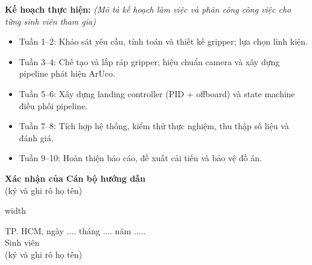 \begin{mdframed}[style=decuongfield]
\vspace{1mm}
\textbf{Kế hoạch thực hiện:} \textit{(Mô tả kế hoạch làm việc và phân công công việc cho từng sinh viên tham gia)}
\begin{itemize}
\item Tuần 1--2: Khảo sát yêu cầu, tính toán và thiết kế gripper; lựa chọn linh kiện.
\item Tuần 3--4: Chế tạo và lắp ráp gripper; hiệu chuẩn camera và xây dựng pipeline phát hiện ArUco.
\item Tuần 5--6: Xây dựng landing controller (PID + offboard) và state machine điều phối pipeline.
\item Tuần 7--8: Tích hợp hệ thống, kiểm thử thực nghiệm, thu thập số liệu và đánh giá.
\item Tuần 9--10: Hoàn thiện báo cáo, đề xuất cải tiến và bảo vệ đồ án.
\end{itemize}
\par\vspace{-2mm}
\noindent\makebox[\linewidth][l]{\hspace*{-2.5mm}\rule{\dimexpr\linewidth+5mm\relax}{0.4pt}}\par

\vspace{3mm}
\noindent
  \begin{minipage}[c][35mm][t]{\dimexpr0.5\linewidth-\arrayrulewidth\relax}
    \vspace{4mm}\centering
    \textbf{Xác nhận của Cán bộ hướng dẫn}\\
    (ký và ghi rõ họ tên)
  \end{minipage}%
  \vrule width\arrayrulewidth
  \begin{minipage}[c][35mm][t]{\dimexpr0.5\linewidth-2\arrayrulewidth\relax}
    \vspace{4mm}\centering
    {\fontsize{11}{15}\selectfont TP. HCM, ngày .... tháng .... năm ..... }\\
    Sinh viên\\
    (ký và ghi rõ họ tên)
  \end{minipage}%

\end{mdframed}
\par
\clearpage
\endgroup
\restoregeometry
